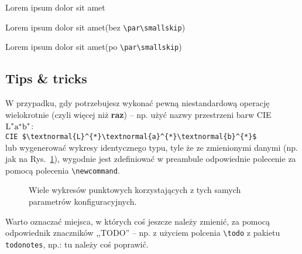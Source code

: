 \documentclass[pdftex,11pt,a4paper]{article}
\newcommand{\PlotTDHist}[3][1.0]%
{%
	\pgfmathsetmacro{\plotscale}{#1}%
	\newcommand{\plottitle}{#2}%
	\newcommand{\filename}{#3}%
}
\begin{document}
\par\smallskip

\noindent
Lorem ipsum dolor sit amet\textellipsis 

\noindent
Lorem ipsum dolor sit amet\textellipsis (bez \verb|\par\smallskip|)

\par\smallskip

\noindent
Lorem ipsum dolor sit amet\textellipsis (po \verb|\par\smallskip|)


\subsection{Tips \& tricks}

W przypadku, gdy potrzebujesz wykonać pewną niestandardową operację wielokrotnie (czyli więcej niż \textbf{raz}) -- np. użyć nazwy przestrzeni barw \mbox{CIE $\textnormal{L}^{*}\textnormal{a}^{*}\textnormal{b}^{*}$}: \\
\hspace*{3em}\lstinline|CIE $\textnormal{L}^{*}\textnormal{a}^{*}\textnormal{b}^{*}$| \\
lub wygenerować wykresy identycznego typu, tyle że ze zmienionymi danymi (np. jak na Rys.~\ref{fig:scatter_plots}), wygodnie jest zdefiniować w preambule odpowiednie polecenie za pomocą polecenia \lstinline|\newcommand|.

\begin{figure}[H]
	\setlength{\imgwidth}{5cm}
	\setlength{\imgheight}{5cm}

	\centering
	
	\begin{subfigure}[c]{0.45\linewidth}
		\PlotTDHist{scatter1}{data/scatter1.csv}
	\end{subfigure}
	\begin{subfigure}[c]{0.45\linewidth}
		\PlotTDHist{scatter2}{data/scatter2.csv}
	\end{subfigure}
	
	\caption{\label{fig:scatter_plots}Wiele wykresów punktowych korzystających z tych samych parametrów konfiguracyjnych.
	}
\end{figure}

\par\bigskip

Warto oznaczać miejsca, w których coś jeszcze należy zmienić, za pomocą odpowiednik znaczników ,,TODO'' -- np. z użyciem polcenia \lstinline|\todo| z pakietu \lstinline|todonotes|, np.: tu należy coś poprawić.
\end{document}
